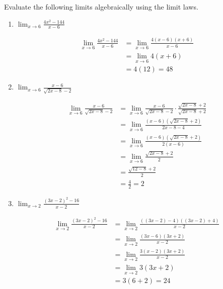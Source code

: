 \message{ !name(limitLaws.tex)}\documentclass[handout,nooutcomes]{ximera}
\begin{document}
\begin{problem}
Evaluate the following limits algebraically using the limit laws.  
	
	\begin{enumerate}
	
	\item $ \lim_{x \to 6} \frac{4x^2 - 144}{x-6}  $
	\begin{freeResponse}
	\begin{align*}
	\lim_{x \to 6} \frac{4x^2 - 144}{x-6} &= \lim_{x \to 6} \frac{4(x-6)(x+6)}{x-6} \\
	&= \lim_{x \to 6} 4(x+6) \\
	&= 4(12) = 48  
	\end{align*}
	\end{freeResponse}
	
	
	\item  $ \lim_{x \to 6} \frac{x-6}{\sqrt{2x-8} - 2}  $
	\begin{freeResponse}
	\begin{align*}
	\lim_{x \to 6} \frac{x-6}{\sqrt{2x-8} - 2} &= \lim_{x \to 6} \frac{x-6}{\sqrt{2x-8} - 2} \cdot \frac{\sqrt{2x-8} + 2}{\sqrt{2x-8}+2} \\
	&= \lim_{x \to 6} \frac{(x-6)(\sqrt{2x-8} + 2)}{2x - 8 - 4} \\
	&= \lim_{x \to 6} \frac{(x-6)(\sqrt{2x-8} + 2)}{2(x-6)} \\
	&= \lim_{x \to 6} \frac{\sqrt{2x-8}+2}{2} \\
	&= \frac{\sqrt{12-8}+2}{2} \\
	&= \frac{4}{2} = 2
	\end{align*}
			
	\end{freeResponse}
	
	
	\item  $ \lim_{x \to 2} \frac{(3x-2)^2 - 16}{x-2}  $
	\begin{freeResponse}
	\begin{align*}
	\lim_{x \to 2} \frac{(3x-2)^2-16}{x-2} &=\lim_{x \to 2} \frac{((3x-2)-4)((3x-2)+4)}{x-2} \\
	&= \lim_{x \to 2} \frac{(3x-6)(3x+2)}{x-2} \\
	&= \lim_{x \to 2} \frac{3(x-2)(3x+2)}{x-2} \\
	&= \lim_{x \to 2} 3(3x+2)  \\
	&= 3(6+2) = 24   
	\end{align*}
	\end{freeResponse}
	

\end{enumerate}
\end{problem}
\end{document}

